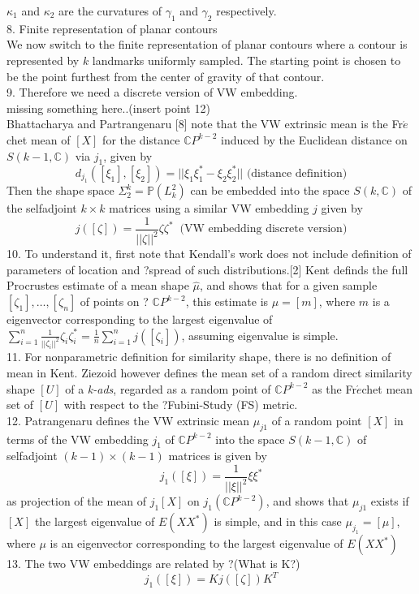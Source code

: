 \documentclass[12pt]{article}
\theoremstyle{definition}
\theoremstyle{remark}
\numberwithin{equation}{section}
\begin{document}
$\kappa_1$ and $\kappa_2$ are the curvatures of $\gamma_1$ and $\gamma_2$ respectively. \\[0.2cm]
8. Finite representation of planar contours\\[0.2cm]
We now switch to the finite representation of planar contours where a contour is represented by $k$ landmarks uniformly sampled. The starting point is chosen to be the point furthest from the center of gravity of that contour. \\[0.2cm]
9. Therefore we need a discrete version of VW embedding. \\[0.2cm]
missing something here..(insert point 12)\\[0.2cm]
Bhattacharya and Partrangenaru [8] note that the VW extrinsic mean is the Fr$\acute{e}$chet mean of $[X]$ for the distance $\mathbb{C}P^{k-2}$ induced by the Euclidean distance on $S(k-1, \mathbb{C})$ via $j_1$, given by
\[d_{j_1}([\xi_1],[\xi_2]) = ||\xi_1\xi_1^* - \xi_2\xi_2^*|| \text{ (distance definition)}\]
Then the shape space $\Sigma_2^k = \mathbb{P}(L_k^2)$ can be embedded into the space $S(k,\mathbb{C})$ of the selfadjoint $k\times k $ matrices using a similar VW embedding $j$ given by
\[j([\zeta])= \frac{1}{||\zeta||^2}\zeta\zeta^*\ \text{ (VW embedding discrete version)}\]
10. To understand it, first note that Kendall's work does not include definition of parameters of location and ?spread of such distributions.[2] Kent definds the full Procrustes estimate of a mean shape $\hat{\mu}$, and shows that for a given sample $[\zeta_1],\dots,[\zeta_n]$ of points on ? $\mathbb{C}P^{k-2}$, this estimate is $\mu = [m]$, where $m$ is a eigenvector corresponding to the largest eigenvalue of $\sum_{i=1}^n\frac{1}{||\zeta_i||^2}\zeta_i\zeta_i^* = \frac{1}{n}\sum_{i=1}^n j([\zeta_i])$, assuming eigenvalue is simple.\\[0.2cm]
11. For nonparametric definition for similarity shape, there is no definition of mean in Kent. Ziezoid however defines the mean set of a random direct similarity shape $[U]$ of a \emph{k-ads}, regarded as a random point of $\mathbb{C}P^{k-2}$ as the Fr$\acute{e}$chet mean set of $[U]$ with respect to the ?Fubini-Study (FS) metric. \\[0.2cm]
12. Patrangenaru defines the VW extrinsic mean $\mu_{j1}$ of a random point $[X]$ in terms of the VW embedding $j_1$ of $\mathbb{C}P^{k-2}$ into the space $S(k-1,\mathbb{C})$ of selfadjoint $(k-1) \times (k-1)$ matrices is given by
\[j_1([\xi]) = \frac{1}{||\xi||^2}\xi\xi^*\]
as projection of the mean of $j_1[X]$ on $j_1(\mathbb{C}P^{k-2})$, and shows that $\mu_{j1}$ exists if $[X]$ the largest eigenvalue of $E(XX^*)$ is simple, and in this case $\mu_{j_1} = [\mu]$, where $\mu$ is an eigenvector corresponding to the largest eigenvalue of $E(XX^*)$ \\[0.2cm]
13. The two VW embeddings are related by  ?(What is K?)
\[j_1([\xi]) = Kj([\zeta])K^T\]
\end{document}
